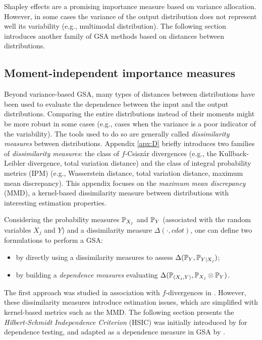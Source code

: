 Shapley effects are a promising importance measure based on variance allocation. 
However, in some cases the variance of the output distribution does not represent well its variability (e.g., multimodal distribution). 
The following section introduces another family of GSA methods based on distances between distributions.

\subsection{Moment-independent importance measures}
Beyond variance-based GSA, many types of distances between distributions have been used to evaluate the dependence between the input and the output distributions. 
Comparing the entire distributions instead of their moments might be more robust in some cases (e.g., cases when the variance is a poor indicator of the variability).
The tools used to do so are generally called \textit{dissimilarity measures} between distributions.  
Appendix \ref{apx:D} briefly introduces two families of \textit{dissimilarity measures}: the class of $f$-Csisz\'{a}r divergences (e.g., the Kullback-Leibler divergence, total variation distance) and the class of integral probability metrics (IPM) (e.g., Wasserstein distance, total variation distance, maximum mean discrepancy). 
This appendix focuses on the \textit{maximum mean discrepancy} (MMD), a kernel-based dissimilarity measure between distributions with interesting estimation properties.  

Considering the probability measures $\P_{X_j}$ and $\P_{Y}$ (associated with the random variables $X_j$ and $Y$) and a dissimilarity measure $\Delta(\cdot, cdot)$, one can define two formulations to perform a GSA: 
\begin{itemize}
    \item by directly using a dissimilarity measures to assess $\Delta(\P_Y, \P_{Y |X_j})$;
    \item by building a \textit{dependence measures} evaluating $\Delta(\P_{(X_j, Y)}, \P_{X_j} \otimes \P_Y)$.
\end{itemize}

The first approach was studied in association with $f$-divergences in \citet{daveiga_2015,rahman_2016}. 
However, these dissimilarity measures introduce estimation issues, which are simplified with kernel-based metrics such as the MMD. 
The following section presents the \textit{Hilbert-Schmidt Independence Criterion} (HSIC) was initially introduced by \citet{gretton_2006} for dependence testing, and adapted as a dependence measure in GSA by \citet{daveiga_2015}. 


